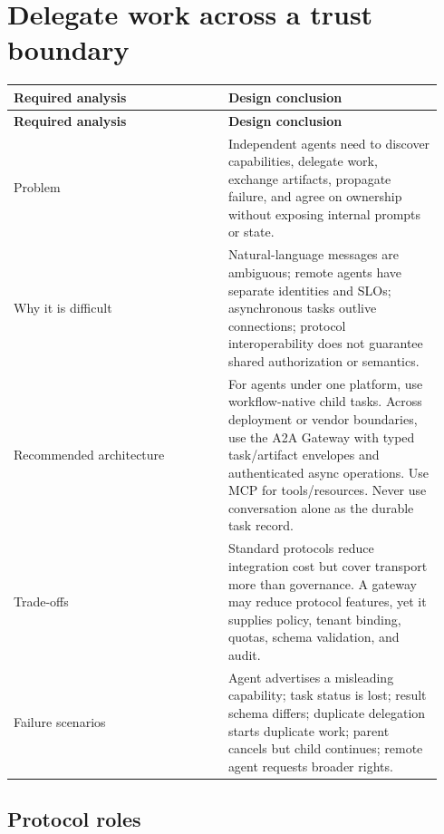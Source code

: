 \section{Delegate work across a trust boundary}

\BookTableStart
\small
\begin{longtable}{@{}Y{0.4700\linewidth}Y{0.4700\linewidth}@{}}
\color{white}\bfseries \textbf{Required analysis} & \color{white}\bfseries \textbf{Design conclusion} \\
\endfirsthead
{}
\color{white}\bfseries \textbf{Required analysis} & \color{white}\bfseries \textbf{Design conclusion} \\
\endhead
Problem & Independent agents need to discover capabilities, delegate work, exchange artifacts, propagate failure, and agree on ownership without exposing internal prompts or state. \\
Why it is difficult & Natural-language messages are ambiguous; remote agents have separate identities and SLOs; asynchronous tasks outlive connections; protocol interoperability does not guarantee shared authorization or semantics. \\
Recommended architecture & For agents under one platform, use workflow-native child tasks. Across deployment or vendor boundaries, use the A2A Gateway with typed task/artifact envelopes and authenticated async operations. Use MCP for tools/resources. Never use conversation alone as the durable task record. \\
Trade-offs & Standard protocols reduce integration cost but cover transport more than governance. A gateway may reduce protocol features, yet it supplies policy, tenant binding, quotas, schema validation, and audit. \\
Failure scenarios & Agent advertises a misleading capability; task status is lost; result schema differs; duplicate delegation starts duplicate work; parent cancels but child continues; remote agent requests broader rights. \\
\end{longtable}
\BookTableEnd

\subsection{Protocol roles}


